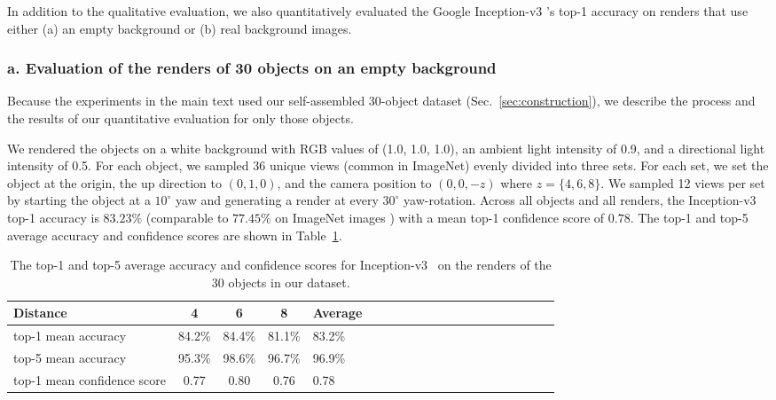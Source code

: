 \documentclass[10pt,twocolumn,letterpaper]{article}
\begin{document}

In addition to the qualitative evaluation, we also quantitatively evaluated the Google Inception-v3 \cite{szegedy2016rethinking}'s top-1 accuracy on renders that use either (a) an empty background or (b) real background images.

\subsubsection*{a. Evaluation of the renders of 30 objects on an empty background} 

Because the experiments in the main text used our self-assembled 30-object dataset (Sec.~\ref{sec:construction}), we describe the process and the results of our quantitative evaluation for only those objects.

We rendered the objects on a white background with RGB values of (1.0, 1.0, 1.0), an ambient light intensity of 0.9, and a directional light intensity of 0.5.
For each object, we sampled 36 unique views (common in ImageNet) evenly divided into three sets.
For each set, we set the object at the origin, the up direction to $(0,1,0)$, and the camera position to $(0,0,-z)$ where $z = \{4, 6, 8\}$.
We sampled 12 views per set by starting the object at a $10^\circ{}$ yaw and generating a render at every $30^\circ{}$ yaw-rotation.
Across all objects and all renders, the Inception-v3 top-1 accuracy is $83.23\%$ (comparable to $77.45\%$ on ImageNet images \cite{szegedy2016rethinking}) with a mean top-1 confidence score of $0.78$.
The top-1 and top-5 average accuracy and confidence scores are shown in
Table~\ref{tab:avg_accuracy_30obj}.

\begin{table}[h]
	\centering
	\begin{tabular}{*{5}{lccc}}
		\toprule
		Distance &  4 & 6 & 8 & Average \\ \midrule
		top-1 mean accuracy & 84.2\% & 84.4\%& 81.1\%& 83.2\%\\
		top-5 mean accuracy & 95.3\% & 98.6\%& 96.7\%& 96.9\% \\
		top-1 mean confidence score & 0.77 & 0.80 & 0.76& 0.78 \\ \bottomrule
	\end{tabular}
	\caption{The top-1 and top-5 average accuracy and confidence scores for Inception-v3~\cite{szegedy2016rethinking} on the renders of the 30 objects in our dataset.}\label{tab:avg_accuracy_30obj}
\end{table}
\end{document}
